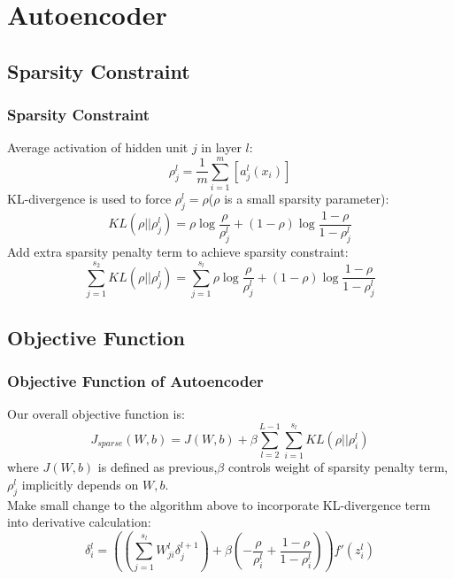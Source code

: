 \documentclass{beamer}
\begin{document}
\begin{CJK*}{UTF8}{gbsn}
\begin{frame}
\end{frame}

\section{Autoencoder}
\subsection{Sparsity Constraint}
\begin{frame}\frametitle{Sparsity Constraint}
Average activation of hidden unit $j$ in layer $l$:
\begin{equation}
\rho_j^l=\frac{1}{m}\sum_{i=1}^m\left[a_j^l(x_i)\right]
\end{equation}
KL-divergence is used to force $\rho_j^l=\rho$($\rho$ is a small sparsity parameter):
\begin{equation}
KL(\rho||\rho_j^l)=\rho\log\frac{\rho}{\rho_j^l}+(1-\rho)\log\frac{1-\rho}{1-\rho_j^l}
\end{equation}
Add extra sparsity penalty term to achieve sparsity constraint:
\begin{equation}
\sum_{j=1}^{s_2}KL(\rho||\rho_j^l)=\sum_{j=1}^{s_l}\rho\log\frac{\rho}{\rho_j^l}+(1-\rho)\log\frac{1-\rho}{1-\rho_j^l}
\end{equation}
\end{frame}

\subsection{Objective Function}
\begin{frame}\frametitle{Objective Function of Autoencoder}
Our overall objective function is:
\begin{equation}
J_{sparse}(W,b)=J(W,b)+\beta\sum_{l=2}^{L-1}\sum_{i=1}^{s_l}KL(\rho||\rho_i^l)
\end{equation}
where $J(W,b)$ is defined as previous,$\beta$ controls weight of sparsity penalty term,$\rho_j^l$ implicitly depends on $W,b$.\\
\bigskip
Make small change to the algorithm above to incorporate KL-divergence term into derivative calculation:
\begin{equation}\label{eq:deltasparse}
\delta_i^l=\left(\left(\sum_{j=1}^{s_l}W_{ji}^l\delta_j^{l+1}\right)+\beta\left(-\frac{\rho}{\rho_i^l}+\frac{1-\rho}{1-\rho_i^l}\right)\right)f'(z_i^l)
\end{equation}
\end{frame}


\end{CJK*}
\end{document}
